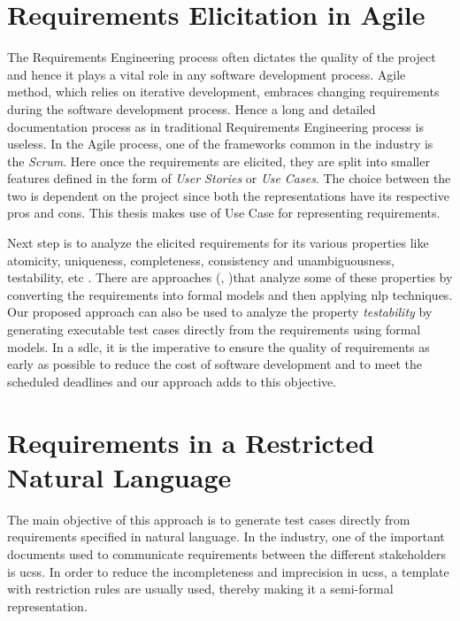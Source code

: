 \section{Requirements Elicitation in Agile}
The Requirements Engineering process often dictates the quality of the project and hence it plays a vital role in any software development process. Agile method, which relies on iterative development, embraces changing requirements during the software development process. Hence a long and detailed documentation process as in traditional Requirements Engineering process is useless. In the Agile process, one of the frameworks common in the industry is the \textit{Scrum}. Here once the requirements are elicited, they are split into smaller features defined in the form of \textit{User Stories} or \textit{Use Cases}. The choice between the two is dependent on the project since both the representations have its respective pros and cons. This thesis makes use of Use Case for representing requirements. 

Next step is to analyze the elicited requirements for its various properties like atomicity, uniqueness, completeness, consistency and unambiguousness, testability, etc \cite{guru99}. There are approaches (\cite{sarmiento2015analysis}, \cite{calisaya2016analysis})that analyze some of these properties by converting the requirements into formal models and then applying \gls{nlp} techniques. Our proposed approach can also be used to analyze the property \textit{testability} by generating executable test cases directly from the requirements using formal models. In a \gls{sdlc}, it is the imperative to ensure the quality of requirements as early as possible to reduce the cost of software development and to meet the scheduled deadlines and our approach adds to this objective.

\section{Requirements in a Restricted Natural Language}
The main objective of this approach is to generate test cases directly from requirements specified in natural language. In the industry, one of the important documents used to communicate requirements between the different stakeholders is \glspl{ucs}. In order to reduce the incompleteness and imprecision in \glspl{ucs}, a template with restriction rules are usually used, thereby making it a semi-formal representation. 


